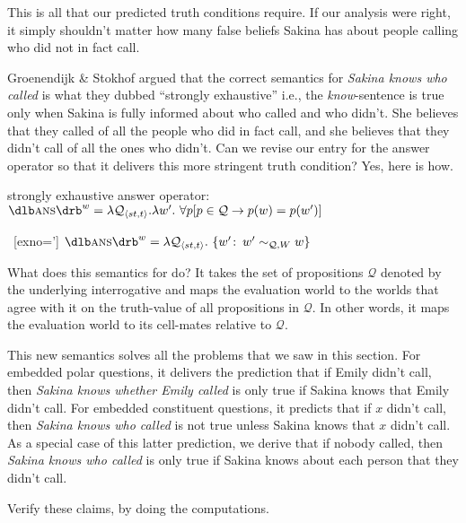 This is all that our predicted truth conditions require. If our analysis were
right, it simply shouldn't matter how many false beliefs Sakina has about people
calling who did not in fact call.

Groenendijk \& Stokhof argued that the correct semantics for \emph{Sakina knows
  who called} is what they dubbed ``strongly exhaustive'' \dash i.e., the
\emph{know}-sentence is true only when Sakina is fully informed about who called
and who didn't. She believes that they called of all the people who did in fact
call, and she believes that they didn't call of all the ones who didn't. Can we
revise our entry for the answer operator so that it delivers this more stringent
truth condition? Yes, here is how.

\ex strongly exhaustive answer operator:\\
$\sv{\ans}^{w} = \lambda \mathcal{Q}_{\type{st,t}}.\lambda w'.\ \forall p [p\in\mathcal{Q} \rightarrow p(w)=p(w')]$
\xe

\ex~[exno=\lastx']%
%
$\sv{\ans}^{w} = \lambda \mathcal{Q}_{\type{st,t}}.\ \{w'\co w'\sim_{\mathcal{Q},W}w\}$
\xe

What does this semantics for \ans do? It takes the set of propositions
$\mathcal{Q}$ denoted by the underlying interrogative and maps the evaluation
world to the worlds that agree with it on the truth-value of all propositions in
$\mathcal{Q}$. In other words, it maps the evaluation world to its cell-mates
relative to $\mathcal{Q}$.

This new semantics solves all the problems that we saw in this section. For
embedded polar questions, it delivers the prediction that if Emily didn't call,
then \emph{Sakina knows whether Emily called} is only true if Sakina knows that
Emily didn't call. For embedded constituent questions, it predicts that if $x$
didn't call, then \emph{Sakina knows who called} is not true unless Sakina knows
that $x$ didn't call. As a special case of this latter prediction, we derive
that if nobody called, then \emph{Sakina knows who called} is only true if
Sakina knows about each person that they didn't call.

\begin{exercise}
  Verify these claims, by doing the computations.
\end{exercise}

